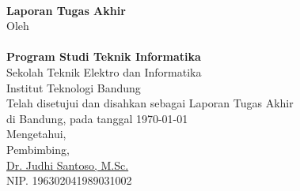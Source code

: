 \clearpage
\pagestyle{empty}

\begin{center}

    \large{\bfseries \MakeUppercase{\thetitle}}
    \\[2\baselineskip]

    \large{\textbf{Laporan Tugas Akhir}}
    \\[2\baselineskip]

    \normalsize{Oleh\\
        \MakeUppercase{\textbf{\theauthor}}\\
        \textbf{Program Studi Teknik Informatika} \\
        Sekolah Teknik Elektro dan Informatika \\
        Institut Teknologi Bandung}
    \\[3\baselineskip]


    \normalsize{
        Telah disetujui dan disahkan sebagai Laporan Tugas Akhir \\
        di Bandung, pada tanggal \today \\
        Mengetahui, \\[1\baselineskip]
        Pembimbing,\\[4\baselineskip]
        \underline{Dr. Judhi Santoso, M.Sc.}\\
        NIP. 196302041989031002}

\end{center}
\clearpage
